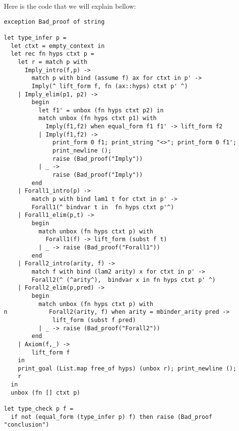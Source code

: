 \documentclass[11pt]{article}
\begin{document}
Here is the code that we will explain bellow:
\begin{verbatim}
exception Bad_proof of string

let type_infer p =
  let ctxt = empty_context in
  let rec fn hyps ctxt p =
    let r = match p with
      Imply_intro(f,p) ->
        match p with bind (assume f) ax for ctxt in p' ->
        Imply(^ lift_form f, fn (ax::hyps) ctxt p' ^)
    | Imply_elim(p1, p2) ->
        begin
          let f1' = unbox (fn hyps ctxt p2) in
          match unbox (fn hyps ctxt p1) with
            Imply(f1,f2) when equal_form f1 f1' -> lift_form f2
          | Imply(f1,f2) ->
              print_form 0 f1; print_string "<>"; print_form 0 f1';
              print_newline ();
              raise (Bad_proof("Imply"))
          | _ ->
              raise (Bad_proof("Imply"))
        end
    | Forall1_intro(p) ->
        match p with bind lam1 t for ctxt in p' ->
        Forall1(^ bindvar t in  fn hyps ctxt p'^)
    | Forall1_elim(p,t) ->
        begin
          match unbox (fn hyps ctxt p) with
            Forall1(f) -> lift_form (subst f t)
          | _ -> raise (Bad_proof("Forall1"))
        end
    | Forall2_intro(arity, f) ->
        match f with bind (lam2 arity) x for ctxt in p' ->
        Forall2(^ (^arity^),  bindvar x in fn hyps ctxt p' ^)
    | Forall2_elim(p,pred) ->
        begin
          match unbox (fn hyps ctxt p) with
n            Forall2(arity, f) when arity = mbinder_arity pred ->
              lift_form (subst f pred)
          | _ -> raise (Bad_proof("Forall2"))
        end
    | Axiom(f,_) ->
        lift_form f
    in
    print_goal (List.map free_of hyps) (unbox r); print_newline ();
    r
  in
  unbox (fn [] ctxt p)

let type_check p f =
  if not (equal_form (type_infer p) f) then raise (Bad_proof "conclusion")
\end{verbatim}
\end{document}
